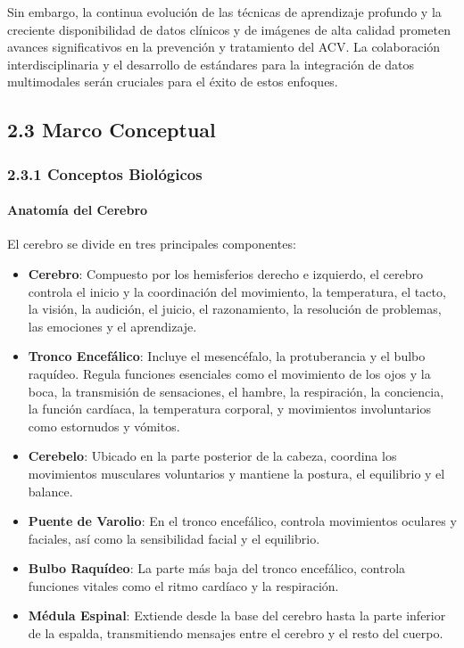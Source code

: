 Sin embargo, la continua evolución de las técnicas de aprendizaje profundo y la creciente disponibilidad de datos clínicos y de imágenes de alta calidad prometen avances significativos en la prevención y tratamiento del ACV. La colaboración interdisciplinaria y el desarrollo de estándares para la integración de datos multimodales serán cruciales para el éxito de estos enfoques.

\subsection{2.3 Marco Conceptual} 
\subsubsection{2.3.1 Conceptos Biológicos} 
\paragraph{Anatomía del Cerebro}
El cerebro se divide en tres principales componentes:
\begin{itemize}
    \item \textbf{Cerebro}: Compuesto por los hemisferios derecho e izquierdo, el cerebro controla el inicio y la coordinación del movimiento, la temperatura, el tacto, la visión, la audición, el juicio, el razonamiento, la resolución de problemas, las emociones y el aprendizaje.
    
    \item \textbf{Tronco Encefálico}: Incluye el mesencéfalo, la protuberancia y el bulbo raquídeo. Regula funciones esenciales como el movimiento de los ojos y la boca, la transmisión de sensaciones, el hambre, la respiración, la conciencia, la función cardíaca, la temperatura corporal, y movimientos involuntarios como estornudos y vómitos.
    
    \item \textbf{Cerebelo}: Ubicado en la parte posterior de la cabeza, coordina los movimientos musculares voluntarios y mantiene la postura, el equilibrio y el balance.

    \item \textbf{Puente de Varolio}: En el tronco encefálico, controla movimientos oculares y faciales, así como la sensibilidad facial y el equilibrio.
    \item \textbf{Bulbo Raquídeo}: La parte más baja del tronco encefálico, controla funciones vitales como el ritmo cardíaco y la respiración.
    \item \textbf{Médula Espinal}: Extiende desde la base del cerebro hasta la parte inferior de la espalda, transmitiendo mensajes entre el cerebro y el resto del cuerpo.
\end{itemize}

